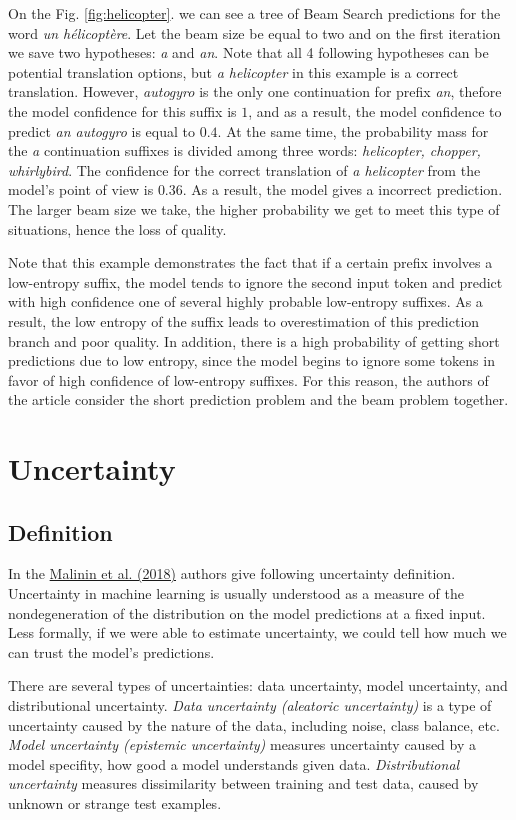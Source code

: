 \documentclass[a4paper,14pt]{extarticle}
\newcommand{\bibref}[3]{\hyperlink{#1}{#2 (#3)}}
\begin{document}
	On the Fig. \ref{fig:helicopter}. we can see a tree of Beam Search predictions for the word \textit{un hélicoptère}. Let the beam size be equal to two and on the first iteration we save two hypotheses: \textit{a} and \textit{an}. Note that all 4 following hypotheses can be potential translation options, but \textit{a helicopter} in this example is a correct translation. However, \textit{autogyro} is the only one continuation for prefix \textit{an}, thefore the model confidence for this suffix is $1$, and as a result, the model confidence to predict \textit{an autogyro} is equal to $0.4$. At the same time, the probability mass for the \textit{a} continuation suffixes is divided among three words: \textit{helicopter, chopper, whirlybird}. The confidence for the correct translation of \textit{a helicopter} from the model's point of view is $0.36$. As a result, the model gives a incorrect prediction. The larger beam size we take, the higher probability we get to meet this type of situations, hence the loss of quality.
	
	Note that this example demonstrates the fact that if a certain prefix involves a low-entropy suffix, the model tends to ignore the second input token and predict with high confidence one of several highly probable low-entropy suffixes. As a result, the low entropy of the suffix leads to overestimation of this prediction branch and poor quality. In addition, there is a high probability of getting short predictions due to low entropy, since the model begins to ignore some tokens in favor of high confidence of low-entropy suffixes. For this reason, the authors of the article consider the short prediction problem and the beam problem together.
	
	\section{Uncertainty}
	\subsection{Definition}
	In the \bibref{prior}{Malinin et al.}{2018} authors give following uncertainty definition. Uncertainty in machine learning is usually understood as a measure of the nondegeneration of the distribution on the model predictions at a fixed input. Less formally, if we were able to estimate uncertainty, we could tell how much we can trust the model's predictions.
	
	There are several types of uncertainties: data uncertainty, model uncertainty, and distributional uncertainty. \textit{Data uncertainty (aleatoric uncertainty)} is a type of uncertainty caused by the nature of the data, including noise, class balance, etc. \textit{Model uncertainty (epistemic uncertainty)}  measures uncertainty caused by a model specifity, how good a model understands given data. \textit{Distributional uncertainty} measures dissimilarity between training and test data, caused by unknown or strange test examples. 
	
\end{document}
